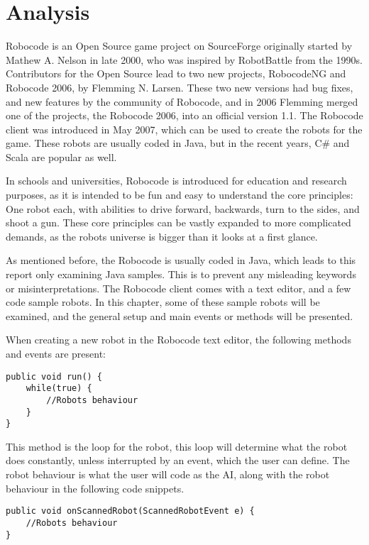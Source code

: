 \chapter{Analysis}
Robocode is an Open Source game project on SourceForge originally started by Mathew A. Nelson in late 2000, who was inspired by RobotBattle from the 1990s. Contributors for the Open Source lead to two new projects, RobocodeNG and Robocode 2006, by Flemming N. Larsen. These two new versions had bug fixes, and new features by the community of Robocode, and in 2006 Flemming merged one of the projects, the Robocode 2006, into an official version 1.1.
The Robocode client was introduced in May 2007, which can be used to create the robots for the game. These robots are usually coded in Java, but in the recent years, C\# and Scala are popular as well.

In schools and universities, Robocode is introduced for education and research purposes, as it is intended to be fun and easy to understand the core principles: One robot each, with abilities to drive forward, backwards, turn to the sides, and shoot a gun. These core principles can be vastly expanded to more complicated demands, as the robots universe is bigger than it looks at a first glance. \citep{RoboReadMe}

As mentioned before, the Robocode is usually coded in Java, which leads to this report only examining Java samples. This is to prevent any misleading keywords or misinterpretations. The Robocode client comes with a text editor, and a few code sample robots. In this chapter, some of these sample robots will be examined, and the general setup and main events or methods will be presented.

When creating a new robot in the Robocode text editor, the following methods and events are present:

\begin{lstlisting}[caption={Eksampel of the main loop in Robocode} label=run, xleftmargin=.2\textwidth]
public void run() {
	while(true) {
		//Robots behaviour
	}
}
\end{lstlisting}

This method is the loop for the robot, this loop will determine what the robot does constantly, unless interrupted by an event, which the user can define. The robot behaviour is what the user will code as the AI, along with the robot behaviour in the following code snippets.

\begin{lstlisting}[caption={Eksampel of the onScannedRobot event from Robocode} label=osr, xleftmargin=.2\textwidth]
public void onScannedRobot(ScannedRobotEvent e) {
	//Robots behaviour
}
\end{lstlisting}

